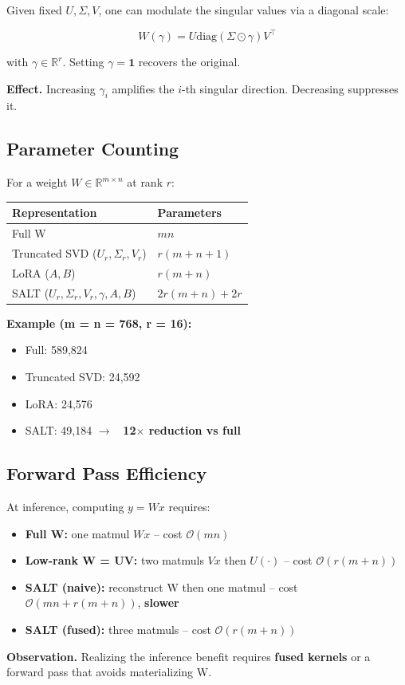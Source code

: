 Given fixed $U, \Sigma, V$, one can modulate the singular values via a 
diagonal scale:

\[
W(\gamma) = U \text{diag}(\Sigma \odot \gamma) V^\top
\tag{3.4}
\]

with $\gamma \in \mathbb{R}^r$. Setting $\gamma = \mathbf{1}$ recovers the 
original.

\textbf{Effect.} Increasing $\gamma_i$ amplifies the $i$-th singular direction. 
Decreasing suppresses it.

\subsection{Parameter Counting}

For a weight $W \in \mathbb{R}^{m \times n}$ at rank $r$:

\begin{table}[H]
\centering
\small
\begin{tabular}{ll}
\toprule
\textbf{Representation} & \textbf{Parameters} \\
\midrule
Full W & $mn$ \\
Truncated SVD ($U_r, \Sigma_r, V_r$) & $r(m + n + 1)$ \\
LoRA ($A, B$) & $r(m + n)$ \\
SALT ($U_r, \Sigma_r, V_r, \gamma, A, B$) & $2r(m + n) + 2r$ \\
\bottomrule
\end{tabular}
\end{table}

\textbf{Example (m = n = 768, r = 16):}

\begin{itemize}
\item Full: 589,824
\item Truncated SVD: 24,592
\item LoRA: 24,576
\item SALT: 49,184 $\to$ \textbf{~12$\times$ reduction vs full}

\end{itemize}
\subsection{Forward Pass Efficiency}

At inference, computing $y = Wx$ requires:

\begin{itemize}
\item \textbf{Full W:} one matmul $Wx$ -- cost $\mathcal{O}(mn)$
\item \textbf{Low-rank W = UV:} two matmuls $Vx$ then $U(\cdot)$ -- cost $\mathcal{O}(r(m+n))$
\item \textbf{SALT (naive):} reconstruct W then one matmul -- cost $\mathcal{O}(mn + r(m+n))$, \textbf{slower}
\item \textbf{SALT (fused):} three matmuls -- cost $\mathcal{O}(r(m+n))$

\end{itemize}
\textbf{Observation.} Realizing the inference benefit requires \textbf{fused kernels} 
or a forward pass that avoids materializing W.

